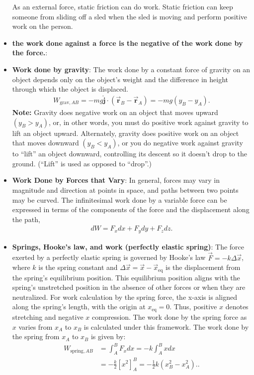 \documentclass{report}
\begin{document}
\begin{itemize}
            \bigbreak \noindent 
            As an external force, static friction can do work. Static friction can keep someone from sliding off a sled when the sled is moving and perform positive work on the person. 
        \item \textbf{the work done against a force is the negative of the work done by the force.}:
        \item \textbf{Work done by gravity}: The work done by a constant force of gravity on an object depends only on the object’s weight and the difference in height through which the object is displaced.
            \begin{align*}
                W_{\text{grav},AB} = -mg\hat{\mathbf{j}} \cdot (\vec{\mathbf{r}}_B - \vec{\mathbf{r}}_A) = -mg(y_B - y_A)
            .\end{align*}
            \textbf{Note:} Gravity does negative work on an object that moves upward $(y_B > y_A)$, or, in other words, you must do positive work against gravity to lift an object upward. Alternately, gravity does positive work on an object that moves downward $(y_B < y_A)$, or you do negative work against gravity to “lift” an object downward, controlling its descent so it doesn’t drop to the ground. (“Lift” is used as opposed to “drop”.)
        \item \textbf{Work Done by Forces that Vary}: In general, forces may vary in magnitude and direction at points in space, and paths between two points may be curved. The infinitesimal work done by a variable force can be expressed in terms of the components of the force and the displacement along the path,
            \begin{align*}
                dW = F_{x}dx + F_{y}dy + F_{z}dz
            .\end{align*}
        \item \textbf{Springs, Hooke's law, and work (perfectly elastic spring)}:
            The force exerted by a perfectly elastic spring is governed by Hooke's law $\vec{F} = -k\Delta\vec{x}$, where $k$ is the spring constant and $\Delta\vec{x} = \vec{x} - \vec{x}_{\text{eq}}$ is the displacement from the spring's equilibrium position. This equilibrium position aligns with the spring's unstretched position in the absence of other forces or when they are neutralized. For work calculation by the spring force, the x-axis is aligned along the spring's length, with the origin at $x_{\text{eq}} = 0$. Thus, positive $x$ denotes stretching and negative $x$ compression. The work done by the spring force as $x$ varies from $x_A$ to $x_B$ is calculated under this framework.
            \bigbreak \noindent 
            The work done by the spring from \( x_A \) to \( x_B \) is given by:
            \begin{align*}
                W_{\text{spring},AB} &= \int_{A}^{B} F_x dx = -k \int_{A}^{B} x dx  \\
                &= -\frac{k}{2} \left[ x^2 \right]_{A}^{B} = -\frac{1}{2}k(x_B^2 - x_A^2).
            .\end{align*}
            \bigbreak \noindent 
            

\end{itemize}
\end{document}
